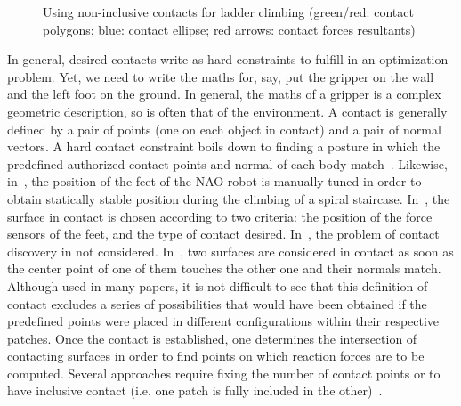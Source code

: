 \begin{figure}
\centering
  \centering
  \setlength\fboxsep{0pt}
  \setlength\fboxrule{1pt}
\caption{Using non-inclusive contacts for ladder climbing (green/red: contact polygons; blue: contact ellipse; red arrows: contact forces resultants)}
\label{fig:hrp2_jrl_complete}
\end{figure}  

In general, desired contacts write as hard constraints to fulfill in an optimization problem. Yet, we need to write the maths for, say, put the gripper on the wall and the left foot on the ground. In general, the maths of a gripper is a complex geometric description, so is often that of the environment. A contact is generally defined by a pair of points (one on each object in contact) and a pair of normal vectors. A hard contact constraint boils down to finding a posture in which the predefined authorized contact points and normal of each body match~\cite{zhang:TePRA:2013}\cite{hauser:IJRR:2008}. Likewise, in~\cite{osswald:iros:2011}, the position of the feet of the NAO robot is manually tuned in order to obtain statically stable position during the climbing of a spiral staircase. In~\cite{Chestnutt:2009:BNR:1733023.1733314}, the surface in contact is chosen according to two criteria: the position of the force sensors of the feet, and the type of contact desired. In~\cite{sentis:itro:2010}, the problem of contact discovery in not considered. In~\cite{mordatch:acm:2012}, two surfaces are considered in contact as soon as the center point of one of them touches the other one and their normals match. Although used in many papers, it is not difficult to see that this definition of contact excludes a series of possibilities that would have been obtained if the predefined points were placed in different configurations within their respective patches. Once the contact is established, one determines the intersection of contacting surfaces in order to find points on which reaction forces are to be computed. Several approaches require fixing the number of contact points or to have inclusive contact (i.e. one patch is fully included in the other)~\cite{bouyarmane:ar:2012}.

